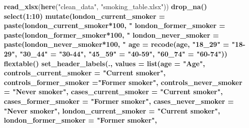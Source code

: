 \documentclass[
]{article}
\newenvironment{Shaded}{\begin{snugshade}}{\end{snugshade}}
\newcommand{\DataTypeTok}[1]{\textcolor[rgb]{0.13,0.29,0.53}{#1}}
\newcommand{\DecValTok}[1]{\textcolor[rgb]{0.00,0.00,0.81}{#1}}
\newcommand{\KeywordTok}[1]{\textcolor[rgb]{0.13,0.29,0.53}{\textbf{#1}}}
\newcommand{\NormalTok}[1]{#1}
\newcommand{\OperatorTok}[1]{\textcolor[rgb]{0.81,0.36,0.00}{\textbf{#1}}}
\newcommand{\StringTok}[1]{\textcolor[rgb]{0.31,0.60,0.02}{#1}}
\begin{document}
\begin{Shaded}
\begin{Highlighting}[]
{{{{{{{{{{{{{\KeywordTok{read_xlsx}\NormalTok{(}\KeywordTok{here}\NormalTok{(}\StringTok{"clean_data"}\NormalTok{, }\StringTok{"smoking_table.xlsx"}\NormalTok{)) }\OperatorTok{%
\StringTok{  }\KeywordTok{drop_na}\NormalTok{() }\OperatorTok{%
\StringTok{  }\KeywordTok{select}\NormalTok{(}\DecValTok{1}\OperatorTok{:}\DecValTok{10}\NormalTok{) }\OperatorTok{%
\StringTok{  }\KeywordTok{mutate}\NormalTok{(}\DataTypeTok{london_current_smoker =} \KeywordTok{paste}\NormalTok{(london_current_smoker}\OperatorTok{*}\DecValTok{100}\NormalTok{, }\StringTok{"%
         \DataTypeTok{london_former_smoker =} \KeywordTok{paste}\NormalTok{(london_former_smoker}\OperatorTok{*}\DecValTok{100}\NormalTok{, }\StringTok{"%
         \DataTypeTok{london_never_smoker =} \KeywordTok{paste}\NormalTok{(london_never_smoker}\OperatorTok{*}\DecValTok{100}\NormalTok{, }\StringTok{"%
         \DataTypeTok{age =} \KeywordTok{recode}\NormalTok{(age, }\StringTok{"18_29"}\NormalTok{ =}\StringTok{ "18-29"}\NormalTok{,}
                      \StringTok{"30_44"}\NormalTok{ =}\StringTok{ "30-44"}\NormalTok{,}
                      \StringTok{"45_59"}\NormalTok{ =}\StringTok{ "40-59"}\NormalTok{,}
                      \StringTok{"60_74"}\NormalTok{ =}\StringTok{ "60-74"}\NormalTok{)) }\OperatorTok{%
\StringTok{  }\KeywordTok{flextable}\NormalTok{() }\OperatorTok{%
\StringTok{  }\KeywordTok{set_header_labels}\NormalTok{(.,}
                    \DataTypeTok{values =} \KeywordTok{list}\NormalTok{(}\DataTypeTok{age =} \StringTok{"Age"}\NormalTok{,}
                                  \DataTypeTok{controls_current_smoker =} \StringTok{"Current smoker"}\NormalTok{,}
                                  \DataTypeTok{controls_former_smoker =}\StringTok{"Former smoker"}\NormalTok{,}
                                  \DataTypeTok{controls_never_smoker =} \StringTok{"Never smoker"}\NormalTok{,}
                                  \DataTypeTok{cases_current_smoker =} \StringTok{"Current smoker"}\NormalTok{,}
                                  \DataTypeTok{cases_former_smoker =} \StringTok{"Former smoker"}\NormalTok{,}
                                  \DataTypeTok{cases_never_smoker =} \StringTok{"Never smoker"}\NormalTok{,}
                                  \DataTypeTok{london_current_smoker =} \StringTok{"Current smoker"}\NormalTok{,}
                                  \DataTypeTok{london_former_smoker =} \StringTok{"Former smoker"}\NormalTok{,}
}}}}}}}}}}}}}}}}}}}}}
\end{Highlighting}
\end{Shaded}
\end{document}
